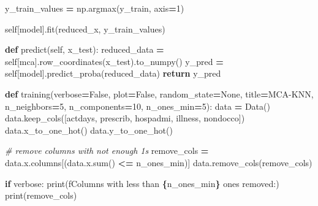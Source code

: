 \documentclass[
]{article}
\newenvironment{Shaded}{\begin{snugshade}}{\end{snugshade}}
\newcommand{\BuiltInTok}[1]{#1}
\newcommand{\CommentTok}[1]{\textcolor[rgb]{0.56,0.35,0.01}{\textit{#1}}}
\newcommand{\ControlFlowTok}[1]{\textcolor[rgb]{0.13,0.29,0.53}{\textbf{#1}}}
\newcommand{\DecValTok}[1]{\textcolor[rgb]{0.00,0.00,0.81}{#1}}
\newcommand{\KeywordTok}[1]{\textcolor[rgb]{0.13,0.29,0.53}{\textbf{#1}}}
\newcommand{\NormalTok}[1]{#1}
\newcommand{\OperatorTok}[1]{\textcolor[rgb]{0.81,0.36,0.00}{\textbf{#1}}}
\newcommand{\SpecialCharTok}[1]{\textcolor[rgb]{0.81,0.36,0.00}{\textbf{#1}}}
\newcommand{\SpecialStringTok}[1]{\textcolor[rgb]{0.31,0.60,0.02}{#1}}
\newcommand{\StringTok}[1]{\textcolor[rgb]{0.31,0.60,0.02}{#1}}
\newcommand{\VariableTok}[1]{\textcolor[rgb]{0.00,0.00,0.00}{#1}}
\begin{document}
\begin{Shaded}
\begin{Highlighting}[]
\NormalTok{        y\_train\_values }\OperatorTok{=}\NormalTok{ np.argmax(y\_train, axis}\OperatorTok{=}\DecValTok{1}\NormalTok{)}

        \VariableTok{self}\NormalTok{[}\StringTok{\textquotesingle{}model\textquotesingle{}}\NormalTok{].fit(reduced\_x, y\_train\_values)}

    \KeywordTok{def}\NormalTok{ predict(}\VariableTok{self}\NormalTok{, x\_test):}
\NormalTok{        reduced\_data }\OperatorTok{=} \VariableTok{self}\NormalTok{[}\StringTok{\textquotesingle{}mca\textquotesingle{}}\NormalTok{].row\_coordinates(x\_test).to\_numpy()}
\NormalTok{        y\_pred }\OperatorTok{=} \VariableTok{self}\NormalTok{[}\StringTok{\textquotesingle{}model\textquotesingle{}}\NormalTok{].predict\_proba(reduced\_data)}
        \ControlFlowTok{return}\NormalTok{ y\_pred}


\KeywordTok{def}\NormalTok{ training(verbose}\OperatorTok{=}\VariableTok{False}\NormalTok{, plot}\OperatorTok{=}\VariableTok{False}\NormalTok{, random\_state}\OperatorTok{=}\VariableTok{None}\NormalTok{, title}\OperatorTok{=}\StringTok{\textquotesingle{}MCA{-}KNN\textquotesingle{}}\NormalTok{,}
\NormalTok{             n\_neighbors}\OperatorTok{=}\DecValTok{5}\NormalTok{, n\_components}\OperatorTok{=}\DecValTok{10}\NormalTok{, n\_ones\_min}\OperatorTok{=}\DecValTok{5}\NormalTok{):}
\NormalTok{    data }\OperatorTok{=}\NormalTok{ Data()}
\NormalTok{    data.keep\_cols([}\StringTok{\textquotesingle{}actdays\textquotesingle{}}\NormalTok{, }\StringTok{\textquotesingle{}prescrib\textquotesingle{}}\NormalTok{, }\StringTok{\textquotesingle{}hospadmi\textquotesingle{}}\NormalTok{, }\StringTok{\textquotesingle{}illness\textquotesingle{}}\NormalTok{, }\StringTok{\textquotesingle{}nondocco\textquotesingle{}}\NormalTok{])}
\NormalTok{    data.x\_to\_one\_hot()}
\NormalTok{    data.y\_to\_one\_hot()}

    \CommentTok{\# remove columns with not enough 1s}
\NormalTok{    remove\_cols }\OperatorTok{=}\NormalTok{ data.x.columns[(data.x.}\BuiltInTok{sum}\NormalTok{() }\OperatorTok{\textless{}=}\NormalTok{ n\_ones\_min)]}
\NormalTok{    data.remove\_cols(remove\_cols)}

    \ControlFlowTok{if}\NormalTok{ verbose:}
        \BuiltInTok{print}\NormalTok{(}\SpecialStringTok{f\textquotesingle{}Columns with less than }\SpecialCharTok{\{}\NormalTok{n\_ones\_min}\SpecialCharTok{\}}\SpecialStringTok{ ones removed:\textquotesingle{}}\NormalTok{)}
        \BuiltInTok{print}\NormalTok{(remove\_cols)}


\end{Highlighting}
\end{Shaded}
\end{document}
